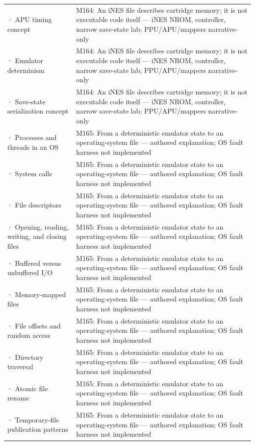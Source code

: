 {\begin{longtable}[]{@{}
  >{\raggedright\arraybackslash}p{}
  >{\raggedright\arraybackslash}p{}@{}}
2742 · APU timing concept & M164: An iNES file describes cartridge memory; it is not executable code itself --- iNES NROM, controller, narrow save-state lab; PPU/APU/mappers narrative-only \\
2743 · Emulator determinism & M164: An iNES file describes cartridge memory; it is not executable code itself --- iNES NROM, controller, narrow save-state lab; PPU/APU/mappers narrative-only \\
2744 · Save-state serialization concept & M164: An iNES file describes cartridge memory; it is not executable code itself --- iNES NROM, controller, narrow save-state lab; PPU/APU/mappers narrative-only \\
2745 · Processes and threads in an OS & M165: From a deterministic emulator state to an operating-system file --- authored explanation; OS fault harness not implemented \\
2746 · System calls & M165: From a deterministic emulator state to an operating-system file --- authored explanation; OS fault harness not implemented \\
2747 · File descriptors & M165: From a deterministic emulator state to an operating-system file --- authored explanation; OS fault harness not implemented \\
2748 · Opening, reading, writing, and closing files & M165: From a deterministic emulator state to an operating-system file --- authored explanation; OS fault harness not implemented \\
2749 · Buffered versus unbuffered I/O & M165: From a deterministic emulator state to an operating-system file --- authored explanation; OS fault harness not implemented \\
2750 · Memory-mapped files & M165: From a deterministic emulator state to an operating-system file --- authored explanation; OS fault harness not implemented \\
2751 · File offsets and random access & M165: From a deterministic emulator state to an operating-system file --- authored explanation; OS fault harness not implemented \\
2752 · Directory traversal & M165: From a deterministic emulator state to an operating-system file --- authored explanation; OS fault harness not implemented \\
2753 · Atomic file rename & M165: From a deterministic emulator state to an operating-system file --- authored explanation; OS fault harness not implemented \\
2754 · Temporary-file publication patterns & M165: From a deterministic emulator state to an operating-system file --- authored explanation; OS fault harness not implemented \\

\end{longtable}}
